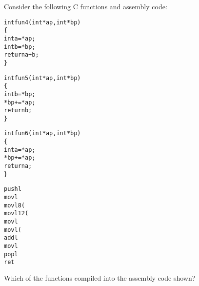 \begin{problem}{3}
\end{problem}

Consider the following C functions and assembly code:

\vspace{.5ex}

\begin{minipage}{3in}
\begin{ccode}
\begin{alltt}
int fun4(int *ap, int *bp)
\verb:{:
    int a = *ap;
    int b = *bp;
    return a+b;
\verb:}:
\end{alltt}
\begin{alltt}
int fun5(int *ap, int *bp)
\verb:{:
    int b = *bp;
    *bp += *ap;
    return b;
\verb:}:
\end{alltt}
\begin{alltt}
int fun6(int *ap, int *bp)
\verb:{:
    int a = *ap;
    *bp += *ap;
    return a;
\verb:}:
\end{alltt}
\end{ccode}
\end{minipage}
\begin{minipage}{3in}
\begin{scode}
\begin{alltt}
  pushl %ebp{\em\scriptsize }
  movl %esp,%ebp{\em\scriptsize }
  movl 8(%ebp),%edx{\em\scriptsize }
  movl 12(%ebp),%eax{\em\scriptsize }
  movl %ebp,%esp{\em\scriptsize }
  movl (%edx),%edx{\em\scriptsize }
  addl %edx,(%eax){\em\scriptsize }
  movl %edx,%eax{\em\scriptsize }
  popl %ebp{\em\scriptsize }
  ret{\em\scriptsize }
\end{alltt}
\end{scode}
\end{minipage}


\vspace{.5ex}

Which of the functions compiled into the assembly code shown?



